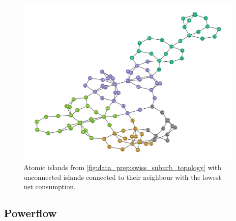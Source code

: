 \begin{figure}[H]
    \begin{center}
        \includegraphics[width=.8\linewidth]{img/switchstate_exploring/swiss_suburb/topology_sss_patched.png}
    \end{center}
    \caption{
        Atomic islands from \autoref{fig:data_prep:swiss_suburb_topology} with unconnected islands
        connected to their neighbour with the lowest net consumption.
    }
    \label{fig:data_prep:swiss_suburb_topology_patched}
\end{figure}

\subsection{Powerflow}

